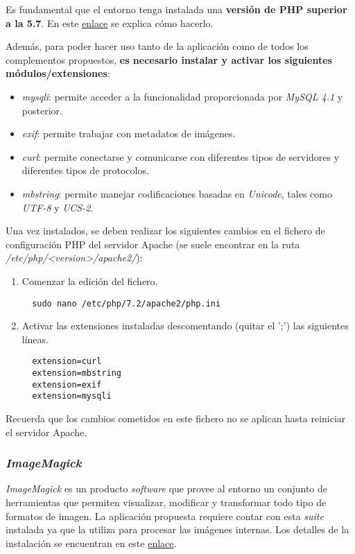 Es fundamental que el entorno tenga instalada una \textbf{versión de PHP
superior a la 5.7}. En este
\href{https://www.php.net/manual/es/install.php}{enlace} se explica cómo
hacerlo.

Además, para poder hacer uso tanto de la aplicación como de todos los
complementos propuestos, \textbf{es necesario instalar y activar los
siguientes módulos/extensiones}:

\begin{itemize}
\tightlist
\item
  \emph{mysqli}: permite acceder a la funcionalidad proporcionada por
  \emph{MySQL 4.1} y posterior.
\item
  \emph{exif}: permite trabajar con metadatos de imágenes.
\item
  \emph{curl}: permite conectarse y comunicarse con diferentes tipos de
  servidores y diferentes tipos de protocolos.
\item
  \emph{mbstring}: permite manejar codificaciones basadas en
  \emph{Unicode}, tales como \emph{UTF-8} y \emph{UCS-2}.
\end{itemize}

Una vez instalados, se deben realizar los siguientes cambios en el
fichero de configuración PHP del servidor Apache (se suele encontrar en
la ruta \emph{/etc/php/\textless version\textgreater/apache2/}):

\begin{enumerate}
\def\labelenumi{\arabic{enumi}.}
\tightlist
\item
  Comenzar la edición del fichero.
  \begin{verbatim}
  sudo nano /etc/php/7.2/apache2/php.ini
  \end{verbatim}
\item
  Activar las extensiones instaladas descomentando (quitar el ';') las
  siguientes líneas.
  \begin{verbatim}
  extension=curl
  extension=mbstring
  extension=exif
  extension=mysqli
  \end{verbatim}
\end{enumerate}

Recuerda que los cambios cometidos en este fichero no se aplican hasta
reiniciar el servidor Apache.

\subsubsection{\emph{ImageMagick}}

\emph{ImageMagick} es un producto \emph{software} que provee al entorno
un conjunto de herramientas que permiten visualizar, modificar y
transformar todo tipo de formatos de imagen. La aplicación propuesta
requiere contar con esta \emph{suite} instalada ya que la utiliza para
procesar las imágenes internas. Los detalles de la instalación se
encuentran en este
\href{https://imagemagick.org/script/install-source.php}{enlace}.

